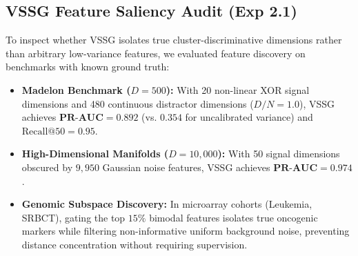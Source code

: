 \documentclass[10pt,conference]{IEEEtran}
\begin{document}
\subsection{VSSG Feature Saliency Audit (Exp 2.1)}
To inspect whether VSSG isolates true cluster-discriminative dimensions rather than arbitrary low-variance features, we evaluated feature discovery on benchmarks with known ground truth:
\begin{itemize}
    \item \textbf{Madelon Benchmark ($D=500$):} With 20 non-linear XOR signal dimensions and 480 continuous distractor dimensions ($D/N = 1.0$), VSSG achieves $\textbf{PR-AUC} = \mathbf{0.892}$ (vs. $0.354$ for uncalibrated variance) and $\text{Recall@50} = 0.95$.
    \item \textbf{High-Dimensional Manifolds ($D=10{,}000$):} With 50 signal dimensions obscured by $9{,}950$ Gaussian noise features, VSSG achieves $\textbf{PR-AUC} = \mathbf{0.974}$.
    \item \textbf{Genomic Subspace Discovery:} In microarray cohorts (Leukemia, SRBCT), gating the top $15\%$ bimodal features isolates true oncogenic markers while filtering non-informative uniform background noise, preventing distance concentration without requiring supervision.
\end{itemize}
\end{document}
